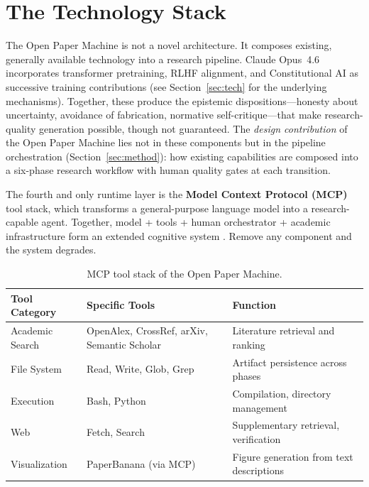 \documentclass{article}
\begin{document}
\section{The Technology Stack}
\label{sec:architecture}

The Open Paper Machine is not a novel architecture. It composes existing, generally available technology into a research pipeline. Claude Opus~4.6 incorporates transformer pretraining, RLHF alignment, and Constitutional AI as successive training contributions (see Section~\ref{sec:tech} for the underlying mechanisms). Together, these produce the epistemic dispositions---honesty about uncertainty, avoidance of fabrication, normative self-critique---that make research-quality generation possible, though not guaranteed. The \textit{design contribution} of the Open Paper Machine lies not in these components but in the pipeline orchestration (Section~\ref{sec:method}): how existing capabilities are composed into a six-phase research workflow with human quality gates at each transition.

The fourth and only runtime layer is the \textbf{Model Context Protocol (MCP)} tool stack, which transforms a general-purpose language model into a research-capable agent. Together, model + tools + human orchestrator + academic infrastructure form an extended cognitive system \citep{hutchins1995cognition}. Remove any component and the system degrades.


\begin{table}[ht]
\centering
\caption{MCP tool stack of the Open Paper Machine.}
\label{tab:tools}
\begin{tabularx}{\textwidth}{@{}lXX@{}}
\toprule
\textbf{Tool Category} & \textbf{Specific Tools} & \textbf{Function} \\
\midrule
Academic Search & OpenAlex, CrossRef, arXiv, Semantic Scholar & Literature retrieval and ranking \\
File System & Read, Write, Glob, Grep & Artifact persistence across phases \\
Execution & Bash, Python & Compilation, directory management \\
Web & Fetch, Search & Supplementary retrieval, verification \\
Visualization & PaperBanana (via MCP) & Figure generation from text descriptions \\
\bottomrule
\end{tabularx}
\end{table}
\end{document}
